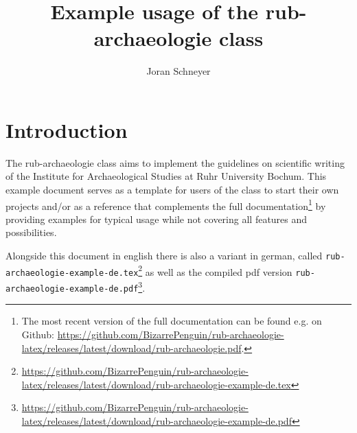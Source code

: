 \documentclass{rub-archaeologie}
\title{Example usage of the \textsf{rub-archaeologie} class}
\author{Joran Schneyer}
\begin{document}
    \maketitle

    \tableofcontents
    \clearpage

    \section{Introduction}
    The \textsf{rub-archaeologie} class aims to implement the guidelines on scientific writing of the Institute for Archaeological Studies at Ruhr University Bochum. This example document serves as a template for users of the class to start their own projects and/or as a reference that complements the full documentation\footnote{The most recent version of the full documentation can be found e.g. on Github: \url{https://github.com/BizarrePenguin/rub-archaeologie-latex/releases/latest/download/rub-archaeologie.pdf}.} by providing examples for typical usage while not covering all features and possibilities.

    Alongside this document in english there is also a variant in german, called \texttt{rub-archaeologie-example-de.tex}\footnote{\url{https://github.com/BizarrePenguin/rub-archaeologie-latex/releases/latest/download/rub-archaeologie-example-de.tex}} as well as the compiled pdf version \texttt{rub-archaeologie-example-de.pdf}\footnote{\url{https://github.com/BizarrePenguin/rub-archaeologie-latex/releases/latest/download/rub-archaeologie-example-de.pdf}}.
\end{document}
